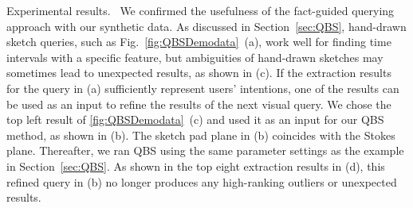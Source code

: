 \textsf{Experimental results.\ } We confirmed the usefulness of the fact-guided querying approach with our synthetic data.
As discussed in Section~\ref{sec:QBS}, 
hand-drawn sketch queries, such as Fig.~\ref{fig:QBSDemodata}~(a), work well for finding time intervals with a specific feature,
but ambiguities of hand-drawn sketches may sometimes lead to unexpected results, as shown in (c).
%
If the extraction results for the query in (a) sufficiently represent users' intentions, one of the results can be used as an input to refine the results of the next visual query.
We chose the top left result of \ref{fig:QBSDemodata}~(c) and used it as an input for our QBS method, as shown in (b). 
The sketch pad plane in (b) coincides with the Stokes plane.
Thereafter, we ran QBS using the same parameter settings as the example in Section~\ref{sec:QBS}.
As shown in the top eight extraction results in (d),  %
this refined query in (b) no longer produces any high-ranking outliers or unexpected results.



